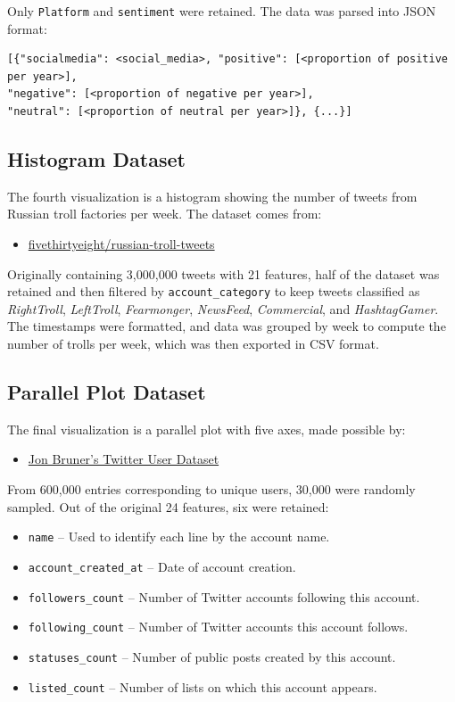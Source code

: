 \documentclass[a4paper,12pt,titlepage,leqno]{article}
\begin{document}
Only \texttt{Platform} and \texttt{sentiment} were retained. The data was parsed into JSON format:

\begin{verbatim}
[{"socialmedia": <social_media>, "positive": [<proportion of positive per year>],
"negative": [<proportion of negative per year>], 
"neutral": [<proportion of neutral per year>]}, {...}]
\end{verbatim}

\subsection{Histogram Dataset}

The fourth visualization is a histogram showing the number of tweets from Russian troll factories per week. The dataset comes from:

\begin{itemize}
    \item \href{https://github.com/fivethirtyeight/russian-troll-tweets}{fivethirtyeight/russian-troll-tweets}
\end{itemize}

Originally containing 3,000,000 tweets with 21 features, half of the dataset was retained and then filtered by \texttt{account\_category} to keep tweets classified as \textit{RightTroll}, \textit{LeftTroll}, \textit{Fearmonger}, \textit{NewsFeed}, \textit{Commercial}, and \textit{HashtagGamer}. The timestamps were formatted, and data was grouped by week to compute the number of trolls per week, which was then exported in CSV format.

\subsection{Parallel Plot Dataset}

The final visualization is a parallel plot with five axes, made possible by:

\begin{itemize}
    \item \href{https://github.com/jonbruner/twitter-analysis}{Jon Bruner's Twitter User Dataset}
\end{itemize}

From 600,000 entries corresponding to unique users, 30,000 were randomly sampled. Out of the original 24 features, six were retained:

\begin{itemize}
    \item \texttt{name} -- Used to identify each line by the account name.
    \item \texttt{account\_created\_at} -- Date of account creation.
    \item \texttt{followers\_count} -- Number of Twitter accounts following this account.
    \item \texttt{following\_count} -- Number of Twitter accounts this account follows.
    \item \texttt{statuses\_count} -- Number of public posts created by this account.
    \item \texttt{listed\_count} -- Number of lists on which this account appears.
\end{itemize}
\end{document}
